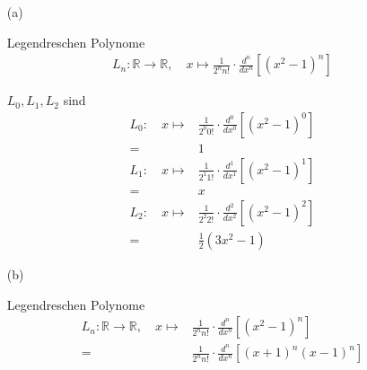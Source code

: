 \begin{enumerate}

\item[(a)]

Legendreschen Polynome
\begin{align*}
L_n:\mathbb{R}\rightarrow\mathbb{R},
\hspace{1em}
x\mapsto\frac{1}{2^n n!}\cdot\frac{d^n}{dx^n}[(x^2-1)^n]
\end{align*}

$L_0,L_1,L_2$ sind
\begin{align*}
L_0:\hspace{1em}
x\mapsto &\frac{1}{2^0 0!}\cdot\frac{d^0}{dx^0}[(x^2-1)^0] \\
=&1 \\
L_1:\hspace{1em}
x\mapsto &\frac{1}{2^1 1!}\cdot\frac{d^1}{dx^1}[(x^2-1)^1] \\
=&x \\
L_2:\hspace{1em}
x\mapsto &\frac{1}{2^2 2!}\cdot\frac{d^2}{dx^2}[(x^2-1)^2] \\
=&\frac{1}{2}(3x^2-1)
\end{align*}

\item[(b)]

Legendreschen Polynome
\begin{align*}
L_n:\mathbb{R}\rightarrow\mathbb{R},
\hspace{1em}
x\mapsto &\frac{1}{2^n n!}\cdot\frac{d^n}{dx^n}[(x^2-1)^n] \\
=&\frac{1}{2^n n!}\cdot\frac{d^n}{dx^n}[(x+1)^n(x-1)^n]
\end{align*}


\end{enumerate}
